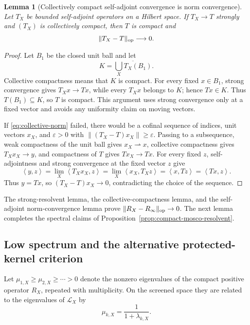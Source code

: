 \documentclass[11pt]{article}
\numberwithin{equation}{section}
\newtheorem{lemma}[theorem]{Lemma}
\theoremstyle{definition}
\theoremstyle{remark}
\newcommand{\norm}[1]{\lVert#1\rVert}
\newcommand{\ip}[2]{\left\langle#1,#2\right\rangle}
\begin{document}
\begin{lemma}[Collectively compact self-adjoint convergence is norm convergence]
\label{lem:collective-norm}
Let $T_X$ be bounded self-adjoint operators on a Hilbert space.  If
$T_X\to T$ strongly and $(T_X)$ is collectively compact, then $T$ is compact
and
\begin{equation}
\norm{T_X-T}_{\rm op}\longrightarrow0.
\label{eq:collective-norm}
\end{equation}
\end{lemma}

\begin{proof}
Let $B_1$ be the closed unit ball and let
\[
 K=\overline{\bigcup_X T_X(B_1)}.
\]
Collective compactness means that $K$ is compact.  For every fixed
$x\in B_1$, strong convergence gives $T_Xx\to Tx$, while every $T_Xx$ belongs
to $K$; hence $Tx\in K$.  Thus $T(B_1)\subseteq K$, so $T$ is compact.  This
argument uses strong convergence only at a fixed vector and avoids any
uniformity claim on moving vectors.

If \eqref{eq:collective-norm} failed, there would be a cofinal sequence of
indices, unit vectors $x_X$, and $\varepsilon>0$ with
$\norm{(T_X-T)x_X}\ge\varepsilon$.  Passing to a subsequence, weak compactness
of the unit ball gives $x_X\rightharpoonup x$, collective compactness gives
$T_Xx_X\to y$, and compactness of $T$ gives $Tx_X\to Tx$.  For every fixed
$z$, self-adjointness and strong convergence at the fixed vector $z$ give
\[
\ip{y}{z}
=\lim_X\ip{T_Xx_X}{z}
=\lim_X\ip{x_X}{T_Xz}
=\ip{x}{Tz}
=\ip{Tx}{z}.
\]
Thus $y=Tx$, so $(T_X-T)x_X\to0$, contradicting the choice of the sequence.
\end{proof}

The strong-resolvent lemma, the collective-compactness lemma, and the
self-adjoint norm-convergence lemma prove
$\|R_X-R_\infty\|_{\rm op}\to0$.  The next lemma completes the spectral
claims of Proposition~\ref{prop:compact-mosco-resolvent}.


\subsection{Low spectrum and the alternative protected-kernel criterion}

Let $\mu_{1,X}\ge\mu_{2,X}\ge\cdots>0$ denote the nonzero eigenvalues of the
compact positive operator $R_X$, repeated with multiplicity.  On the screened
space they are related to the eigenvalues of $\mathscr L_X$ by
\begin{equation}
\mu_{k,X}=\frac{1}{1+\lambda_{k,X}}.
\label{eq:resolvent-spectrum-map}
\end{equation}
\end{document}
